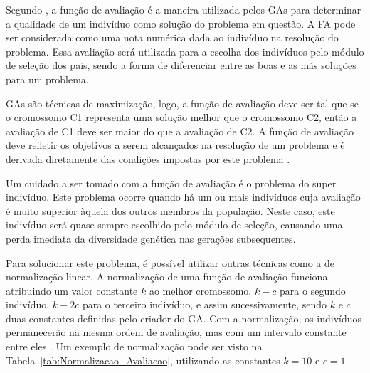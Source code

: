 \documentclass[12pt,oneside,a4paper,english,french,spanish,brazil,]{abntex2}
\begin{document}
Segundo \citet{linden:2008}, a função de avaliação é a maneira utilizada pelos GAs para determinar a qualidade de um indivíduo como solução do problema em questão. A FA pode ser considerada como uma nota numérica dada ao indivíduo na resolução do problema. Essa avaliação será utilizada para a escolha dos indivíduos pelo módulo de seleção dos pais, sendo a forma de diferenciar entre as boas e as más soluções para um problema.

GAs são técnicas de maximização, logo, a função de avaliação deve ser tal que se o cromossomo C1 representa uma solução melhor que o cromossomo C2, então a avaliação de C1 deve ser maior do que a avaliação de C2. A função de avaliação deve refletir os objetivos a serem alcançados na resolução de um problema e é derivada diretamente das condições impostas por este problema \cite{holland:1992}.

Um cuidado a ser tomado com a função de avaliação é o problema do super indivíduo. Este problema ocorre quando há um ou mais indivíduos cuja avaliação é muito superior àquela dos outros membros da população. Neste caso, este indivíduo será quase sempre escolhido pelo módulo de seleção, causando uma perda imediata da diversidade genética nas gerações subsequentes.

Para solucionar este problema, é possível utilizar outras técnicas como a de normalização linear. A normalização de uma função de avaliação funciona atribuindo um valor constante \(k\) ao melhor cromossomo, \(k - c\) para o segundo indivíduo, \(k - 2c\) para o terceiro indivíduo, e assim sucessivamente, sendo \(k\) e \(c\) duas constantes definidas pelo criador do GA. Com a normalização, os indivíduos permanecerão na mesma ordem de avaliação, mas com um intervalo constante entre eles  \cite{linden:2008}. Um exemplo de normalização pode ser visto na Tabela~\ref{tab:Normalizacao_Avaliacao}, utilizando as constantes \(k = 10\) e \(c = 1\).
\end{document}
